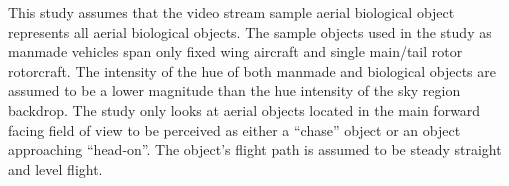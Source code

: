 \indent This study assumes that the video stream sample aerial biological object represents all aerial biological objects. The sample objects used in the study as manmade vehicles span only fixed wing aircraft and single main/tail rotor rotorcraft. The intensity of the hue of both manmade and biological objects are assumed to be a lower magnitude than the hue intensity of the sky region backdrop. The study only looks at aerial objects located in the main forward facing field of view to be perceived as either a “chase” object or an object approaching “head-on”. The object’s flight path is assumed to be steady straight and level flight.\\
\newpage